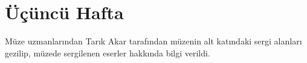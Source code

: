 \section{Üçüncü Hafta}
\indent\indent Müze uzmanlarından Tarık Akar tarafından müzenin alt katındaki sergi alanları gezilip, müzede sergilenen eserler hakkında bilgi verildi. 


